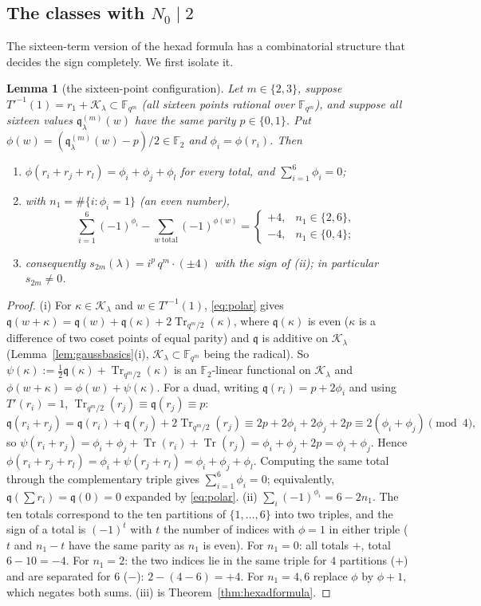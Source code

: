\documentclass[12pt,a4paper]{amsart}
\newtheorem{lemma}[theorem]{Lemma}
\theoremstyle{definition}
\newcommand{\F}{\mathbb{F}}
\newcommand{\Tr}{\operatorname{Tr}}
\newcommand{\Kk}{\mathcal{K}}
\newcommand{\qq}{\mathfrak{q}}
\begin{document}
\subsection{The classes with \texorpdfstring{$N_0\mid2$}{N0 | 2}}
The sixteen-term version of the hexad formula has a combinatorial structure that decides the sign completely. We first isolate it.

\begin{lemma}[the sixteen-point configuration]\label{lem:sixteen}
Let $m\in\{2,3\}$, suppose $T'^{-1}(1)=r_1+\Kk_\lambda\subset\F_{q^m}$ (all sixteen points rational over $\F_{q^m}$), and suppose all sixteen values $\qq^{(m)}_\lambda(w)$ have the same parity $p\in\{0,1\}$. Put $\phi(w)=(\qq^{(m)}_\lambda(w)-p)/2\in\F_2$ and $\phi_i=\phi(r_i)$. Then
\begin{enumerate}[label=\textup{(\roman*)},leftmargin=2em]
\item $\phi(r_i+r_j+r_l)=\phi_i+\phi_j+\phi_l$ for every total, and $\sum_{i=1}^6\phi_i=0$;
\item with $n_1=\#\{i:\phi_i=1\}$ (an even number),
\[
\sum_{i=1}^6(-1)^{\phi_i}-\sum_{w\ \mathrm{total}}(-1)^{\phi(w)}=\begin{cases}+4,& n_1\in\{2,6\},\\ -4,& n_1\in\{0,4\};\end{cases}
\]
\item consequently $s_{2m}(\lambda)=i^{p}\,q^m\cdot(\pm4)$ with the sign of \textup{(ii)}; in particular $s_{2m}\ne0$.
\end{enumerate}
\end{lemma}
\begin{proof}
(i) For $\kappa\in\Kk_\lambda$ and $w\in T'^{-1}(1)$, \eqref{eq:polar} gives $\qq(w+\kappa)=\qq(w)+\qq(\kappa)+2\Tr_{q^m/2}(\kappa)$, where $\qq(\kappa)$ is even ($\kappa$ is a difference of two coset points of equal parity) and $\qq$ is additive on $\Kk_\lambda$ (Lemma~\ref{lem:gaussbasics}(i), $\Kk_\lambda\subset\F_{q^m}$ being the radical). So $\psi(\kappa):=\frac12\qq(\kappa)+\Tr_{q^m/2}(\kappa)$ is an $\F_2$-linear functional on $\Kk_\lambda$ and $\phi(w+\kappa)=\phi(w)+\psi(\kappa)$. For a duad, writing $\qq(r_i)=p+2\phi_i$ and using $T'(r_i)=1$, $\Tr_{q^m/2}(r_j)\equiv\qq(r_j)\equiv p$:
\[
\qq(r_i+r_j)=\qq(r_i)+\qq(r_j)+2\Tr_{q^m/2}(r_j)\equiv2p+2\phi_i+2\phi_j+2p\equiv2(\phi_i+\phi_j)\pmod4,
\]
so $\psi(r_i+r_j)=\phi_i+\phi_j+\Tr(r_i)+\Tr(r_j)=\phi_i+\phi_j+2p=\phi_i+\phi_j$. Hence $\phi(r_i+r_j+r_l)=\phi_i+\psi(r_j+r_l)=\phi_i+\phi_j+\phi_l$. Computing the same total through the complementary triple gives $\sum_{i=1}^6\phi_i=0$; equivalently, $\qq(\sum r_i)=\qq(0)=0$ expanded by \eqref{eq:polar}.
(ii) $\sum_i(-1)^{\phi_i}=6-2n_1$. The ten totals correspond to the ten partitions of $\{1,\dots,6\}$ into two triples, and the sign of a total is $(-1)^{t}$ with $t$ the number of indices with $\phi=1$ in either triple ($t$ and $n_1-t$ have the same parity as $n_1$ is even). For $n_1=0$: all totals $+$, total $6-10=-4$. For $n_1=2$: the two indices lie in the same triple for $4$ partitions ($+$) and are separated for $6$ ($-$): $2-(4-6)=+4$. For $n_1=4,6$ replace $\phi$ by $\phi+1$, which negates both sums. (iii) is Theorem~\ref{thm:hexadformula}.
\end{proof}
\end{document}
